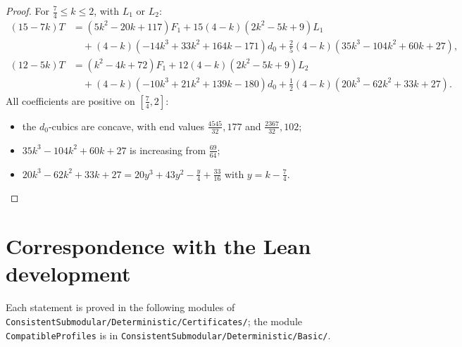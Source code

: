\documentclass[11pt,a4paper]{article}
\numberwithin{equation}{section}
\theoremstyle{definition}
\begin{document}
\begin{proof}
For $\frac74\le k\le2$, with $L_1$ or $L_2$:
\begin{align*}
(15-7k)T&=(5k^2-20k+117)F_1+15(4-k)(2k^2-5k+9)L_1\\
&\quad+(4-k)(-14k^3+33k^2+164k-171)d_0+\tfrac25(4-k)(35k^3-104k^2+60k+27),\\
(12-5k)T&=(k^2-4k+72)F_1+12(4-k)(2k^2-5k+9)L_2\\
&\quad+(4-k)(-10k^3+21k^2+139k-180)d_0+\tfrac12(4-k)(20k^3-62k^2+33k+27).
\end{align*}
All coefficients are positive on $[\frac74,2]$:
\begin{itemize}
\item the $d_0$-cubics are concave, with end values $\frac{4545}{32},177$ and
$\frac{2367}{32},102$;
\item $35k^3-104k^2+60k+27$ is increasing from $\frac{69}{64}$;
\item $20k^3-62k^2+33k+27=20y^3+43y^2-\frac y4+\frac{33}{16}$ with
$y=k-\frac74$.
\qedhere
\end{itemize}
\end{proof}

\section{Correspondence with the Lean development}\label{app:lean}

Each statement is proved in the following modules of
\nolinkurl{ConsistentSubmodular/Deterministic/Certificates/}; the module
\texttt{CompatibleProfiles} is in \nolinkurl{ConsistentSubmodular/Deterministic/Basic/}.
\end{document}
